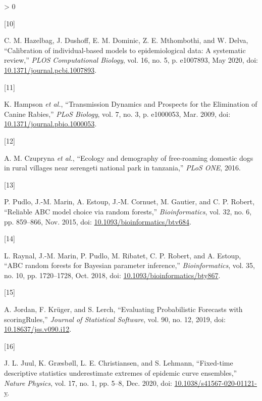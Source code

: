 \documentclass[
  oneside]{book}
\newlength{\cslhangindent}
\newlength{\csllabelwidth}
\newenvironment{CSLReferences}[2] %
 {%
  \setlength{\parindent}{0pt}
  \ifodd #1 \everypar{\setlength{\hangindent}{\cslhangindent}}\ignorespaces\fi
  \ifnum #2 > 0
  \setlength{\parskip}{#2\baselineskip}
  \fi
 }%
 {}
\newcommand{\CSLLeftMargin}[1]{\parbox[t]{\csllabelwidth}{#1}}
\newcommand{\CSLRightInline}[1]{\parbox[t]{\linewidth - \csllabelwidth}{#1}\break}
\begin{document}
\begin{CSLReferences}{0}{0}
\leavevmode\hypertarget{ref-hazelbag2020}{}%
\CSLLeftMargin{{[}10{]} }
\CSLRightInline{C. M. Hazelbag, J. Dushoff, E. M. Dominic, Z. E. Mthombothi, and W. Delva, {``Calibration of individual-based models to epidemiological data: A systematic review,''} \emph{PLOS Computational Biology}, vol. 16, no. 5, p. e1007893, May 2020, doi: \href{https://doi.org/10.1371/journal.pcbi.1007893}{10.1371/journal.pcbi.1007893}.}

\leavevmode\hypertarget{ref-Hampson2009}{}%
\CSLLeftMargin{{[}11{]} }
\CSLRightInline{K. Hampson \emph{et al.}, {``Transmission Dynamics and Prospects for the Elimination of Canine Rabies,''} \emph{PLoS Biology}, vol. 7, no. 3, p. e1000053, Mar. 2009, doi: \href{https://doi.org/10.1371/journal.pbio.1000053}{10.1371/journal.pbio.1000053}.}

\leavevmode\hypertarget{ref-czupryna2016}{}%
\CSLLeftMargin{{[}12{]} }
\CSLRightInline{A. M. Czupryna \emph{et al.}, {``Ecology and demography of free-roaming domestic dogs in rural villages near serengeti national park in tanzania,''} \emph{PLoS ONE}, 2016.}

\leavevmode\hypertarget{ref-pudlo2015}{}%
\CSLLeftMargin{{[}13{]} }
\CSLRightInline{P. Pudlo, J.-M. Marin, A. Estoup, J.-M. Cornuet, M. Gautier, and C. P. Robert, {``Reliable ABC model choice via random forests,''} \emph{Bioinformatics}, vol. 32, no. 6, pp. 859--866, Nov. 2015, doi: \href{https://doi.org/10.1093/bioinformatics/btv684}{10.1093/bioinformatics/btv684}.}

\leavevmode\hypertarget{ref-raynal2018}{}%
\CSLLeftMargin{{[}14{]} }
\CSLRightInline{L. Raynal, J.-M. Marin, P. Pudlo, M. Ribatet, C. P. Robert, and A. Estoup, {``ABC random forests for Bayesian parameter inference,''} \emph{Bioinformatics}, vol. 35, no. 10, pp. 1720--1728, Oct. 2018, doi: \href{https://doi.org/10.1093/bioinformatics/bty867}{10.1093/bioinformatics/bty867}.}

\leavevmode\hypertarget{ref-jordan2019}{}%
\CSLLeftMargin{{[}15{]} }
\CSLRightInline{A. Jordan, F. Krüger, and S. Lerch, {``Evaluating Probabilistic Forecasts with scoringRules,''} \emph{Journal of Statistical Software}, vol. 90, no. 12, 2019, doi: \href{https://doi.org/10.18637/jss.v090.i12}{10.18637/jss.v090.i12}.}

\leavevmode\hypertarget{ref-juul2020}{}%
\CSLLeftMargin{{[}16{]} }
\CSLRightInline{J. L. Juul, K. Græsbøll, L. E. Christiansen, and S. Lehmann, {``Fixed-time descriptive statistics underestimate extremes of epidemic curve ensembles,''} \emph{Nature Physics}, vol. 17, no. 1, pp. 5--8, Dec. 2020, doi: \href{https://doi.org/10.1038/s41567-020-01121-y}{10.1038/s41567-020-01121-y}.}


\end{CSLReferences}
\end{document}
